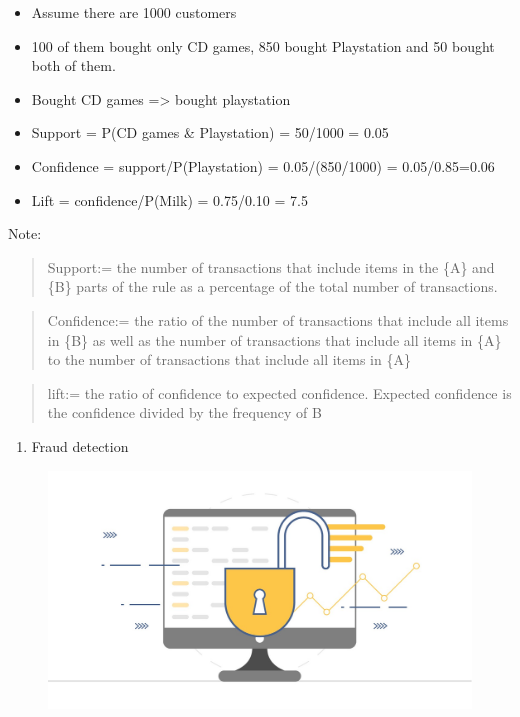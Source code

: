 \documentclass[]{book}
\providecommand{\tightlist}{%
  \setlength{\itemsep}{0pt}\setlength{\parskip}{0pt}}
\begin{document}
\begin{itemize}
\tightlist
\item
  Assume there are 1000 customers
\item
  100 of them bought only CD games, 850 bought Playstation and 50 bought
  both of them.
\item
  Bought CD games =\textgreater{} bought playstation
\item
  Support = P(CD games \& Playstation) = 50/1000 = 0.05
\item
  Confidence = support/P(Playstation) = 0.05/(850/1000) = 0.05/0.85=0.06
\item
  Lift = confidence/P(Milk) = 0.75/0.10 = 7.5
\end{itemize}

Note:

\begin{quote}
Support:= the number of transactions that include items in the \{A\} and
\{B\} parts of the rule as a percentage of the total number of
transactions.
\end{quote}

\begin{quote}
Confidence:= the ratio of the number of transactions that include all
items in \{B\} as well as the number of transactions that include all
items in \{A\} to the number of transactions that include all items in
\{A\}
\end{quote}

\begin{quote}
lift:= the ratio of confidence to expected confidence. Expected
confidence is the confidence divided by the frequency of B
\end{quote}

\begin{enumerate}
\def\labelenumi{\arabic{enumi}.}
\setcounter{enumi}{6}
\tightlist
\item
  Fraud detection
\end{enumerate}

\begin{figure}
\centering
\includegraphics{19.jpg}
\caption{}
\end{figure}
\end{document}

